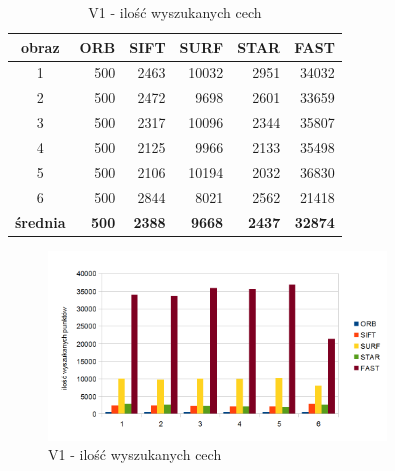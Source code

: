 \begin{table}[htbp]
  \centering
  \caption{V1 - ilość wyszukanych cech}
    \begin{tabular}{|c|r|r|r|r|r|}\hline
    
    obraz & \textbf{ORB} & \textbf{SIFT} & \textbf{SURF} & \textbf{STAR} & \textbf{FAST} \\\hline
    
  
    1 & 500 & 2463 & 10032 & 2951 & 34032 \\
    2 & 500 & 2472 & 9698 & 2601 & 33659 \\
    3 & 500 & 2317 & 10096 & 2344 & 35807 \\
    4 & 500 & 2125 & 9966 & 2133 & 35498 \\
    5 & 500 & 2106 & 10194 & 2032 & 36830 \\
    6 & 500 & 2844 & 8021 & 2562 & 21418 \\\hline
    \textbf{średnia} & \textbf{500} & \textbf{2388} & \textbf{9668} & \textbf{2437} & \textbf{32874} \\
    \hline
    \end{tabular}%
  \label{tab:v1_f1}%
\end{table}%


\begin{figure}
\centering
\includegraphics[width=0.8\textwidth]{pict/slowik/v1/f1.png}
\caption{V1 - ilość wyszukanych cech}
\label{fig:v1_f1}
\end{figure}


